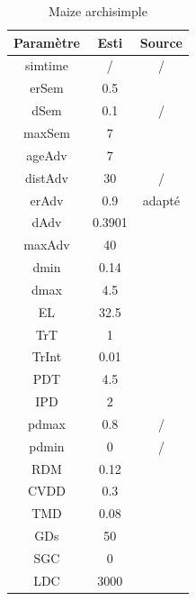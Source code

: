 \label{an:Maize}
\begin{table}[ht]
    \centering
    \caption{Maize archisimple}
    \begin{tabular}{c c c}
        Paramètre & Esti & Source \\
        \hline
       simtime & / & / \\
       erSem & 0.5 & \cite{kumar_goyal_how_2021} \\
       dSem & 0.1 & / \cite{pace_analysis_2014} \\
       maxSem & 7 & \cite{kumar_goyal_how_2021} \\
       ageAdv & 7 & \cite{kumar_goyal_how_2021} \\
       distAdv & 30 & / \\
       erAdv & 0.9 & \cite{pages_calibration_2014} adapté \\
       dAdv & 0.3901 & \cite{noauthor_global_2023} \\
       maxAdv & 40 & \cite{pages_calibration_2014} \\
       dmin & 0.14 & \cite{pages_calibration_2014} \\
       dmax & 4.5 & \cite{vanhees_root_2020} \\
       EL & 32.5 & \cite{cahn_relationship_1989} \\
       TrT & 1 & \cite{pages_calibration_2014} \\
       TrInt & 0.01 & \cite{pages_calibration_2014} \\
       PDT & 4.5 & \cite{gerard_modelling_2017} \\
       IPD & 2 & \cite{pages_calibration_2014} \\
       pdmax & 0.8 & / \\
       pdmin & 0 & / \\
       RDM & 0.12 & \cite{pages_calibration_2014} \\
       CVDD & 0.3 & \cite{pages_calibration_2014} \\
       TMD & 0.08 & \cite{pages_calibration_2014} \\
       GDs & 50 & \cite{pages_calibration_2014} \\
       SGC & 0 & \cite{pages_calibration_2014} \\
       LDC & 3000 & \cite{pages_calibration_2014}
    \end{tabular}
\end{table}
